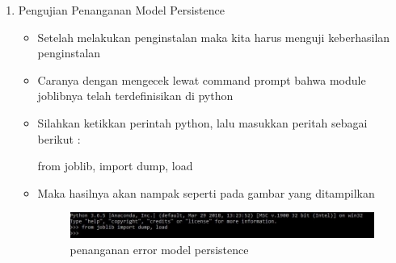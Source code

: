 \par
\begin{enumerate}
\item Pengujian Penanganan Model Persistence
\begin{itemize}
\item Setelah melakukan penginstalan maka kita harus menguji keberhasilan penginstalan
\item Caranya dengan mengecek lewat command prompt bahwa module joblibnya telah terdefinisikan di python
\item Silahkan ketikkan perintah python, lalu masukkan peritah sebagai berikut :
\par from joblib, import dump, load
\par
\item Maka hasilnya akan nampak seperti pada gambar yang ditampilkan

\begin{figure}[ht]
\centering
\includegraphics[scale=0.5]{figures/penanganan2.jpg}
\caption{penanganan error model persistence }
\label{contoh}
\end{figure}

\par
\end{itemize}
\end{enumerate}
\par
